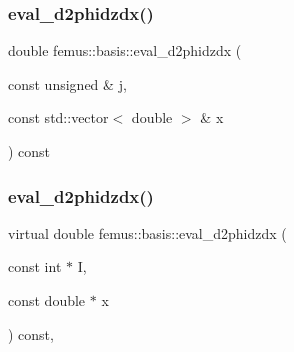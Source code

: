 \mbox{\label{classfemus_1_1basis_aff9731d83408aa82eb148b8fc83ef9d8}} 
\subsubsection{\texorpdfstring{eval\+\_\+d2phidzdx()}{eval\_d2phidzdx()}\hspace{0.1cm}{\footnotesize\ttfamily [1/2]}}
{\footnotesize\ttfamily double femus\+::basis\+::eval\+\_\+d2phidzdx (\begin{DoxyParamCaption}\item[{const unsigned \&}]{j,  }\item[{const std\+::vector$<$ double $>$ \&}]{x }\end{DoxyParamCaption}) const\hspace{0.3cm}{\ttfamily [inline]}}

\mbox{\label{classfemus_1_1basis_a5d619ec5bd57b7d2dc34a99d69975c77}} 
\subsubsection{\texorpdfstring{eval\+\_\+d2phidzdx()}{eval\_d2phidzdx()}\hspace{0.1cm}{\footnotesize\ttfamily [2/2]}}
{\footnotesize\ttfamily virtual double femus\+::basis\+::eval\+\_\+d2phidzdx (\begin{DoxyParamCaption}\item[{const int $\ast$}]{I,  }\item[{const double $\ast$}]{x }\end{DoxyParamCaption}) const\hspace{0.3cm}{\ttfamily [inline]}, {\ttfamily [virtual]}}



